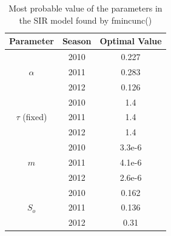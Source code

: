 \documentclass[11pt, a4paper]{article}
\begin{document}




\begin{table}[H]
\FloatBarrier
\centering
\begin{tabular}{| c | c | c |}
    \hline
    Parameter & Season & Optimal Value \\ \hline
    \multirow{3}{*}{$\alpha$} & 2010 & 0.227\\
    & 2011 & 0.283\\
    & 2012 & 0.126 \\ \hline
    \multirow{3}{*}{$\tau$ (fixed)} & 2010 & 1.4 \\ 
    & 2011 & 1.4\\
    & 2012 & 1.4\\ \hline
    \multirow{3}{*}{$m$} & 2010 & 3.3e-6\\ 
    & 2011 & 4.1e-6 \\
    & 2012 & 2.6e-6 \\ \hline
    \multirow{3}{*}{$S_o$} & 2010 & 0.162 \\ 
    & 2011 & 0.136 \\ 
    & 2012 & 0.31 \\ \hline
    \end{tabular}
    \caption{Most probable value of the parameters in the SIR model found by fmincunc()}
    \label{tab:sir}
\end{table}
\end{document}
